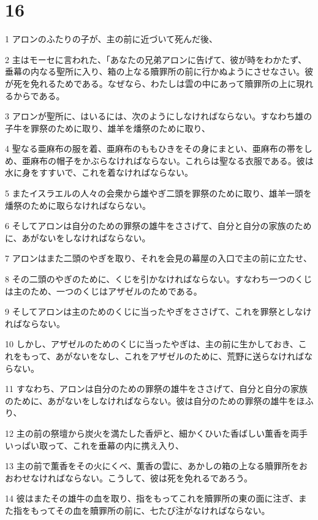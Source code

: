 \chapter{16}

\par 1 アロンのふたりの子が、主の前に近づいて死んだ後、
\par 2 主はモーセに言われた、「あなたの兄弟アロンに告げて、彼が時をわかたず、垂幕の内なる聖所に入り、箱の上なる贖罪所の前に行かぬようにさせなさい。彼が死を免れるためである。なぜなら、わたしは雲の中にあって贖罪所の上に現れるからである。
\par 3 アロンが聖所に、はいるには、次のようにしなければならない。すなわち雄の子牛を罪祭のために取り、雄羊を燔祭のために取り、
\par 4 聖なる亜麻布の服を着、亜麻布のももひきをその身にまとい、亜麻布の帯をしめ、亜麻布の帽子をかぶらなければならない。これらは聖なる衣服である。彼は水に身をすすいで、これを着なければならない。
\par 5 またイスラエルの人々の会衆から雄やぎ二頭を罪祭のために取り、雄羊一頭を燔祭のために取らなければならない。
\par 6 そしてアロンは自分のための罪祭の雄牛をささげて、自分と自分の家族のために、あがないをしなければならない。
\par 7 アロンはまた二頭のやぎを取り、それを会見の幕屋の入口で主の前に立たせ、
\par 8 その二頭のやぎのために、くじを引かなければならない。すなわち一つのくじは主のため、一つのくじはアザゼルのためである。
\par 9 そしてアロンは主のためのくじに当ったやぎをささげて、これを罪祭としなければならない。
\par 10 しかし、アザゼルのためのくじに当ったやぎは、主の前に生かしておき、これをもって、あがないをなし、これをアザゼルのために、荒野に送らなければならない。
\par 11 すなわち、アロンは自分のための罪祭の雄牛をささげて、自分と自分の家族のために、あがないをしなければならない。彼は自分のための罪祭の雄牛をほふり、
\par 12 主の前の祭壇から炭火を満たした香炉と、細かくひいた香ばしい薫香を両手いっぱい取って、これを垂幕の内に携え入り、
\par 13 主の前で薫香をその火にくべ、薫香の雲に、あかしの箱の上なる贖罪所をおおわせなければならない。こうして、彼は死を免れるであろう。
\par 14 彼はまたその雄牛の血を取り、指をもってこれを贖罪所の東の面に注ぎ、また指をもってその血を贖罪所の前に、七たび注がなければならない。
